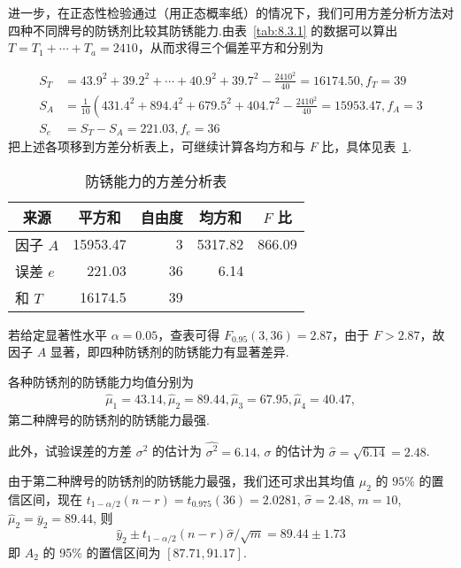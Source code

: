 \begin{example}
进一步，在正态性检验通过（用正态概率纸）的情况下，我们可用方差分析方法对四种不同牌号的防锈剂比较其防锈能力.由表~\ref{tab:8.3.1} 的数据可以算出 $T = T_1 + \cdots + T_a = 2410$，从而求得三个偏差平方和分别为

\begin{align*}
S_{T} & =43.9^{2}+39.2^{2}+\cdots+40.9^{2}+39.7^{2}-\frac{2410^{2}}{40}=16174.50, f_{T}=39 \\
S_{A} & =\frac{1}{10}\left(431.4^{2}+894.4^{2}+679.5^{2}+404.7^{2}-\frac{2410^{2}}{40}=15953.47, f_{A}=3\right. \\ 
S_{e} & =S_{T}-S_{A}=221.03, f_{e} = 36
\end{align*}
把上述各项移到方差分析表上，可继续计算各均方和与 $F$ 比，具体见表~\ref{tab:8.3.2}.

\begin{table}[htbp]
  \centering
  \caption{防锈能力的方差分析表}
    \begin{tabular}{lrrrr}
    \toprule
    \multicolumn{1}{c}{来源} & \multicolumn{1}{c}{平方和} & \multicolumn{1}{c}{自由度} & \multicolumn{1}{c}{均方和} & \multicolumn{1}{c}{$F$ 比} \\
    \midrule
    因子 $A$   & 15953.47 & 3     & 5317.82 & 866.09 \\
    误差 $e$   & 221.03 & 36    & 6.14  &  \\
    和 $T$    & 16174.5 & 39    &       &  \\
    \bottomrule
    \end{tabular}%
  \label{tab:8.3.2}%
\end{table}%


若给定显著性水平 $\alpha = 0.05$，查表可得 $F_{0.95}(3,36)=2.87$，由于 $F>2.87$，故因子 $A$ 显著，即四种防锈剂的防锈能力有显著差异.

各种防锈剂的防锈能力均值分别为
\begin{gather*}
\hat{\mu}_1=43.14, \hat{\mu}_2=89.44, \hat{\mu}_3=67.95, \hat{\mu}_4 = 40.47,
\end{gather*}
第二种牌号的防锈剂的防锈能力最强.
  
此外，试验误差的方差 $\sigma^2$ 的估计为 $\hat{\sigma^2}=6.14$, $\sigma$ 的估计为 $\hat{\sigma}=\sqrt{6.14}=
2.48$.

由于第二种牌号的防锈剂的防锈能力最强，我们还可求出其均值 $\mu_2$ 的 $95\%$ 的置信区间，现在 $t_{1-\alpha/2}(n-r)=t_{0.975}(36)=2.0281$, $\hat{\sigma}=2.48$, $m=10$, $\hat{\mu}_2=\bar{y}_2=89.44$, 则
\begin{equation*}
  \hat{y}_{2} \pm t_{1-\alpha / 2}(n-r) \hat{\sigma} / \sqrt{m}=89.44 \pm 1.73
\end{equation*}
即 $A_2$ 的 95\% 的置信区间为 $[87.71, 91.17]$.
\end{example}

